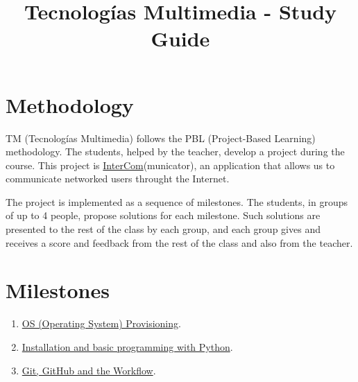\title{Tecnologías Multimedia - Study Guide}

\maketitle

\section{Methodology}
TM (Tecnologías Multimedia) follows the PBL (Project-Based Learning) methodology. The students,
helped by the teacher, develop a project during the course. This
project
is \href{https://github.com/Tecnologias-multimedia/intercom}{InterCom}(municator),
an application that allows us to communicate networked users throught
the Internet.

The project is implemented as a sequence of milestones. The students,
in groups of up to 4 people, propose solutions for each
milestone. Such solutions are presented to the rest of the class by
each group, and each group gives and receives a score and feedback
from the rest of the class and also from the teacher.

\section{Milestones}
\begin{enumerate}
\item \href{https://tecnologias-multimedia.github.io/study_guide/milestone00/}{OS (Operating System) Provisioning}.
\item \href{https://tecnologias-multimedia.github.io/study_guide/milestone01/}{Installation and basic programming with Python}.
\item \href{https://tecnologias-multimedia.github.io/study_guide/milestone02/}{Git, GitHub and the Workflow}.
\end{enumerate}

